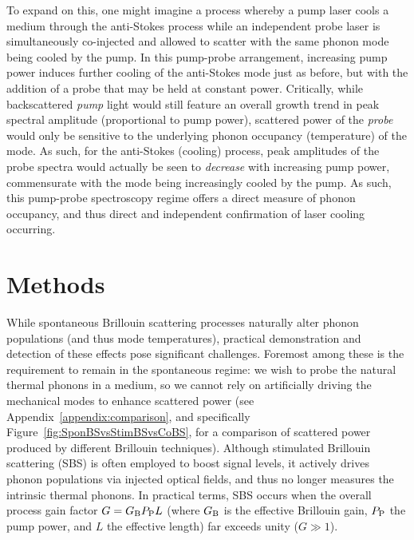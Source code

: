 To expand on this, one might imagine a process whereby a pump laser cools a medium through the anti-Stokes process while an independent probe laser is simultaneously co-injected and allowed to scatter with the same phonon mode being cooled by the pump. In this pump-probe arrangement, increasing pump power induces further cooling of the anti-Stokes mode just as before, but with the addition of a probe that may be held at constant power. Critically, while backscattered \emph{pump} light would still feature an overall growth trend in peak spectral amplitude (proportional to pump power), scattered power of the \emph{probe} would only be sensitive to the underlying phonon occupancy (temperature) of the mode. As such, for the anti-Stokes (cooling) process, peak amplitudes of the probe spectra would actually be seen to \emph{decrease} with increasing pump power, commensurate with the mode being increasingly cooled by the pump. As such, this pump-probe spectroscopy regime offers a direct measure of phonon occupancy, and thus direct and independent confirmation of laser cooling occurring.

\section{Methods}
\label{Cooling:sec:Methods}

While spontaneous Brillouin scattering processes naturally alter phonon populations (and thus mode temperatures), practical demonstration and detection of these effects pose significant challenges. Foremost among these is the requirement to remain in the spontaneous regime: we wish to probe the natural thermal phonons in a medium, so we cannot rely on artificially driving the mechanical modes to enhance scattered power (see Appendix~\ref{appendix:comparison}, and specifically Figure~\ref{fig:SponBSvsStimBSvsCoBS}, for a comparison of scattered power produced by different Brillouin techniques). Although stimulated Brillouin scattering (SBS) is often employed to boost signal levels, it actively drives phonon populations via injected optical fields, and thus no longer measures the intrinsic thermal phonons. In practical terms, SBS occurs when the overall process gain factor \(G = G_{\rm B}P_{\rm P}L\) (where \(G_{\rm B}\) is the effective Brillouin gain, \(P_{\rm P}\) the pump power, and \(L\) the effective length) far exceeds unity (\(G \gg 1\)).

